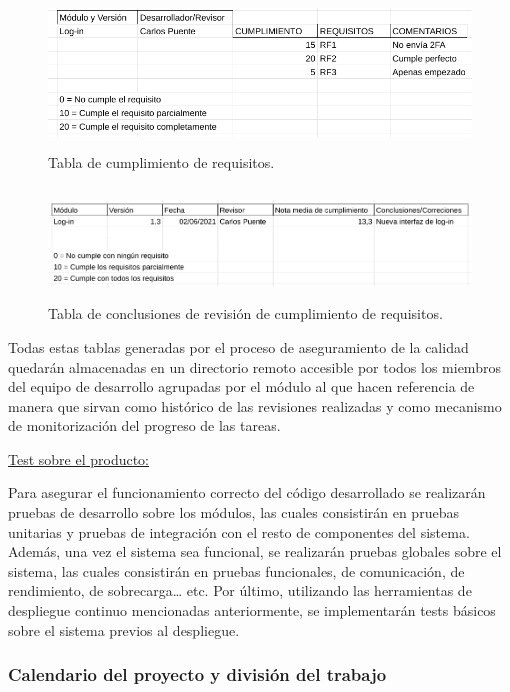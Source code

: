 \documentclass{article}
\begin{document}
\begin{figure}[H]
    \centering
        \includegraphics[height=4cm]{../images/tabla_cumplimiento_requisitos.png}
    \caption{Tabla de cumplimiento de requisitos.}
    \label{tablaRequisitos}
\end{figure}

\begin{figure}[H]
    \centering
        \includegraphics[height=3cm]{../images/tabla_conclusiones_revision_requisitos.png}
    \caption{Tabla de conclusiones de revisión de cumplimiento de requisitos.}
    \label{tablaConclusionesRequisitos}
\end{figure}

Todas estas tablas generadas por el proceso de aseguramiento de la calidad quedarán almacenadas en un directorio 
remoto accesible por todos los miembros del equipo de desarrollo agrupadas por el módulo al que hacen referencia 
de manera que sirvan como histórico de las revisiones realizadas y como mecanismo de monitorización del progreso
de las tareas.

\underline{Test sobre el producto: }

Para asegurar el funcionamiento correcto del código desarrollado se realizarán pruebas de desarrollo sobre los módulos, 
las cuales consistirán en pruebas unitarias y pruebas de integración con el resto de componentes del sistema. 
Además, una vez el sistema sea funcional, se realizarán pruebas globales sobre el sistema, las cuales consistirán en 
pruebas funcionales, de comunicación, de rendimiento, de sobrecarga… etc. 
Por último, utilizando las herramientas de despliegue continuo mencionadas anteriormente, se implementarán tests básicos 
sobre el sistema previos al despliegue.

\subsubsection{Calendario del proyecto y división del trabajo}
\end{document}

